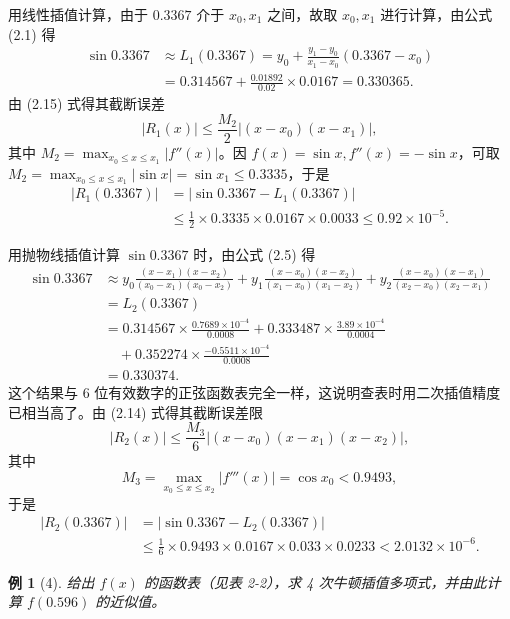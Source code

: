 \documentclass[a4paper,12pt]{ctexart}
\theoremstyle{exampleStyle}
\newtheorem*{example}{例}
\begin{document}
用线性插值计算，由于 $0.3367$ 介于 $x_0, x_1$ 之间，故取 $x_0, x_1$ 进行计算，由公式 (2.1) 得
\begin{align*}
\sin 0.3367 &\approx L_1(0.3367) = y_0 + \frac{y_1 - y_0}{x_1 - x_0}(0.3367 - x_0) \\
&= 0.314567 + \frac{0.01892}{0.02} \times 0.0167 = 0.330365.
\end{align*}
由 (2.15) 式得其截断误差
\[
|R_1(x)| \leqslant \frac{M_2}{2} \left| (x - x_0)(x - x_1) \right|,
\]
其中 $M_2 = \max_{x_0 \leqslant x \leqslant x_1} |f''(x)|$。因 $f(x) = \sin x, f''(x) = -\sin x$，可取 $M_2 = \max_{x_0 \leqslant x \leqslant x_1} |\sin x| = \sin x_1 \leqslant 0.3335$，于是
\begin{align*}
|R_1(0.3367)| &= |\sin 0.3367 - L_1(0.3367)| \\
&\leqslant \frac{1}{2} \times 0.3335 \times 0.0167 \times 0.0033 \leqslant 0.92 \times 10^{-5}.
\end{align*}

用抛物线插值计算 $\sin 0.3367$ 时，由公式 (2.5) 得
\begin{align*}
\sin 0.3367 &\approx y_0 \frac{(x - x_1)(x - x_2)}{(x_0 - x_1)(x_0 - x_2)} + y_1 \frac{(x - x_0)(x - x_2)}{(x_1 - x_0)(x_1 - x_2)} + y_2 \frac{(x - x_0)(x - x_1)}{(x_2 - x_0)(x_2 - x_1)} \\
&= L_2(0.3367) \\
&= 0.314567 \times \frac{0.7689 \times 10^{-4}}{0.0008} + 0.333487 \times \frac{3.89 \times 10^{-4}}{0.0004} \\
&\quad + 0.352274 \times \frac{-0.5511 \times 10^{-4}}{0.0008} \\
&= 0.330374.
\end{align*}
这个结果与 6 位有效数字的正弦函数表完全一样，这说明查表时用二次插值精度已相当高了。由 (2.14) 式得其截断误差限
\[
|R_2(x)| \leqslant \frac{M_3}{6} \left| (x - x_0)(x - x_1)(x - x_2) \right|,
\]
其中
\[
M_3 = \max_{x_0 \leqslant x \leqslant x_2} |f'''(x)| = \cos x_0 < 0.9493,
\]
于是
\begin{align*}
|R_2(0.3367)| &= |\sin 0.3367 - L_2(0.3367)| \\
&\leqslant \frac{1}{6} \times 0.9493 \times 0.0167 \times 0.033 \times 0.0233 < 2.0132 \times 10^{-6}.
\end{align*}

\begin{example}[4]
给出 $f(x)$ 的函数表（见表 2-2），求 4 次牛顿插值多项式，并由此计算 $f(0.596)$ 的近似值。
\end{example}
\end{document}
